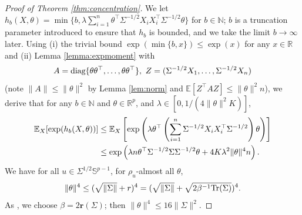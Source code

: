 \documentclass[11pt,a4paper]{article}
\theoremstyle{remark}
\theoremstyle{definition}
\newcommand{\bX}{X}
\newcommand{\bZ}{Z}
\newcommand{\bu}{u}
\newcommand{\btheta}{\theta}
\newcommand{\bfA}{A}
\newcommand{\bSigma}{\Sigma}
\newcommand{\bbS}{\mathbb{S}}
\newcommand{\N}{\mathbb{N}}
\newcommand{\R}{\mathbb{R}}
\newcommand{\E}{\mathbb{E}}
\newcommand{\tr}{\textnormal{Tr}}
\newcommand{\diag}{\textnormal{diag}}
\newcommand{\er}{\mathbf{r}}
\theoremstyle{definition}
\begin{document}
\begin{bibunit}[apalike]
\begin{proof}[Proof of Theorem \ref{thm:concentration}]
    We let $h_{b}(\bX,\btheta)=\min\{b,\lambda\sum_{i=1}^{n}\btheta^{\top}\bSigma^{-1/2}\bX_{i}\bX_{i}^{\top}\bSigma^{-1/2}\btheta\}$ for $b\in\N$; $b$ is a truncation parameter introduced to ensure that $h_b$ is bounded, and we take the limit $b\to\infty$ later.
    Using (i) the trivial bound $\exp(\min\{b,x\})\le \exp(x)$ for any $x\in\R$ and (ii) Lemma \ref{lemma:expmoment} with 
    \begin{equation*}
        \bfA=\diag\{\btheta\btheta^{\top},\ldots,\btheta\btheta^{\top}\},\ \bZ=(\bSigma^{-1/2}\bX_{1},\ldots,\bSigma^{-1/2}\bX_{n})
    \end{equation*}
    (note $\|\bfA\|\le \|\btheta\|^{2}$ by Lemma \ref{lem:norm} and $\E[\bZ^{\top}\bfA\bZ]\le \|\btheta\|^{2}n$), we derive that for any $b\in\N$ and $\btheta\in\R^{p}$, and $\lambda\in[0,1/(4\|\btheta\|^{2}K)]$,
    \begin{align}
        \E_{\bX}[\exp (h_{b}(\bX,\btheta))]&\le \E_{\bX}\left[\exp\left(\lambda\btheta^{\top} \left(\sum_{i=1}^{n}\bSigma^{-1/2}\bX_{i}\bX_{i}^{\top}\bSigma^{-1/2}\right)\btheta\right)\right]\notag\\
        &\le \exp\left(\lambda n\btheta^{\top}\bSigma^{-1/2}\bSigma\bSigma^{-1/2}\btheta+4K\lambda^{2}\|\btheta\|^{4}n\right).\label{eq:expmoment:1}
    \end{align}
    We have for all $\bu\in\bSigma^{1/2}\bbS^{p-1}$, for $\rho_{\bu}$-almost all $\btheta$,
    \begin{equation*}
        \|\btheta\|^{4}\le (\sqrt{\|\bSigma\|}+r)^{4}=(\sqrt{\|\bSigma\|}+\sqrt{2\beta^{-1}\tr(\bSigma)})^{4}.
    \end{equation*}
    As \citet{zhivotovskiy2024dimension}, we choose $\beta=2\er(\bSigma)$; then $\|\btheta\|^{4}\le 16\|\bSigma\|^{2}$.
    

\end{proof}
\end{bibunit}
\end{document}
